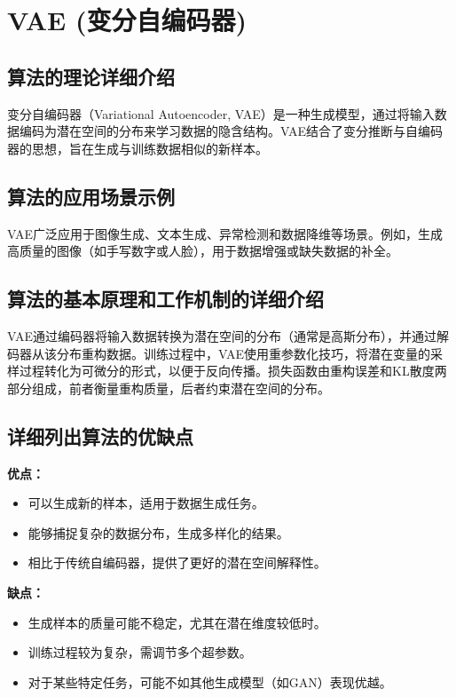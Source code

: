 \section{VAE (变分自编码器)}
\subsection*{算法的理论详细介绍}
变分自编码器（Variational Autoencoder, VAE）是一种生成模型，通过将输入数据编码为潜在空间的分布来学习数据的隐含结构。VAE结合了变分推断与自编码器的思想，旨在生成与训练数据相似的新样本。

\subsection*{算法的应用场景示例}
VAE广泛应用于图像生成、文本生成、异常检测和数据降维等场景。例如，生成高质量的图像（如手写数字或人脸），用于数据增强或缺失数据的补全。

\subsection*{算法的基本原理和工作机制的详细介绍}
VAE通过编码器将输入数据转换为潜在空间的分布（通常是高斯分布），并通过解码器从该分布重构数据。训练过程中，VAE使用重参数化技巧，将潜在变量的采样过程转化为可微分的形式，以便于反向传播。损失函数由重构误差和KL散度两部分组成，前者衡量重构质量，后者约束潜在空间的分布。

\subsection*{详细列出算法的优缺点}
\textbf{优点：}
\begin{itemize}
    \item 可以生成新的样本，适用于数据生成任务。
    \item 能够捕捉复杂的数据分布，生成多样化的结果。
    \item 相比于传统自编码器，提供了更好的潜在空间解释性。
\end{itemize}

\textbf{缺点：}
\begin{itemize}
    \item 生成样本的质量可能不稳定，尤其在潜在维度较低时。
    \item 训练过程较为复杂，需调节多个超参数。
    \item 对于某些特定任务，可能不如其他生成模型（如GAN）表现优越。
\end{itemize}

